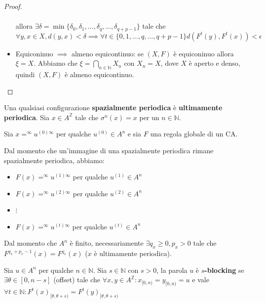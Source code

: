 \begin{teorema}
\begin{proof}
\begin{itemize}
\begin{equation*}
\begin{array}{cl}
                      \end{array}
                  \end{equation*}
                  allora $\exists \delta = \min \{\delta_0,\delta_1, \dots, \delta_q,\dots, \delta_{q+p-1}\}$ tale che
                  $$\forall y, x\in X, d(y,x) < \delta \implies \forall t\in \{0,1,\dots,q,\dots,q+p-1\} d(F^t(y),F^t(x))< \epsilon $$
            \item Equiconinuo $\implies$ almeno equicontinuo: se $(X ,F)$ è equiconinuo
                  allora $\xi = X$.  Abbiamo che $\xi = \bigcap_{n\in \mathbb{N}}X_n$ con $X_n= X$,
                  dove $X$ è aperto e denso, quindi $(X,F)$ è almeno equicontinuo.
        \end{itemize}
    \end{proof}
\end{teorema}

\begin{nota}
    Una qualsiasi configurazione \textbf{spazialmente periodica} è \textbf{ultimamente periodica}.
    Sia $x\in A^\mathbb{Z}$ tale che $\sigma ^n(x)=x$ per un $n\in \mathbb{N}$.

    Sia $x=^\infty u^{(0)\infty}$ per qualche $u^{(0)}\in  A^n$ e sia $F$ una regola
    globale di un CA.

    Dal momento che un'immagine di una spazialmente periodica rimane spazialmente periodica,
    abbiamo:
    \begin{itemize}
        \item $F(x)=^\infty u^{(1)\infty}$ per qualche $u^{(1)}\in  A^n$
        \item $F(x)=^\infty u^{(2)\infty}$ per qualche $u^{(2)}\in  A^n$
        \item $\vdots$
        \item $F(x)=^\infty u^{(t)\infty}$ per qualche $u^{(t)}\in  A^n$
    \end{itemize}
    Dal momento che $A^n$ è finito, necessariamente $\exists q_x\ge 0, p_x> 0$
    tale che $F^{q_x+p_x-1}(x)=F^{q_x}(x)$ ($x$ è ultimamente periodica).
\end{nota}
\begin{definizione}
    Sia $u\in A^n$ per qualche $n\in \mathbb{N}$. Sia $s\in \mathbb{N}$ con $s>0$,
    la parola $u$ è $s$\textbf{-blocking} se $\exists \theta\in [0,n-s]$ (offset)
    tale che $\forall x,y\in A^\mathbb{Z}:x_{[0,n)}=y_{[0,n)}=u$ e vale $\forall t\in \mathbb{N}:
        F^t(x)_{[\theta,\theta +s)} =F^t(y)_{[\theta,\theta +s)}$
\end{definizione}

